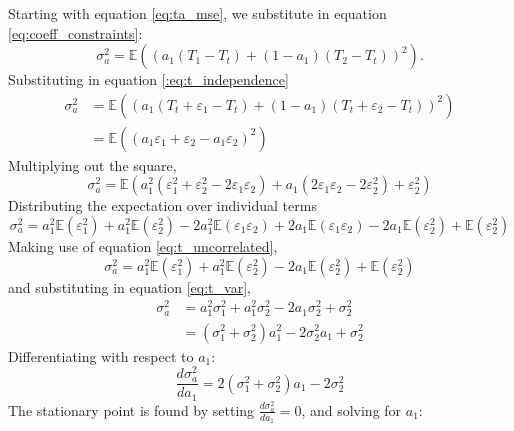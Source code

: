 Starting with equation \ref{eq:ta_mse}, we substitute in equation \ref{eq:coeff_constraints}:
\begin{equation*}
        \sigma_a^2 = \mathbb{E} \left( \left( a_1 \left( T_1 - T_t \right) + (1 - a_1) \left( T_2 - T_t \right) \right)^2 \right).
\end{equation*}
Substituting in equation \ref{:eq:t_independence}
\begin{align*}
        \sigma_a^2 &= \mathbb{E} \left( \left( a_1 \left( T_t + \varepsilon_1 - T_t \right) + (1 - a_1) \left( T_t +\varepsilon_2 - T_t \right) \right)^2 \right) \\
                    &= \mathbb{E} \left( \left( a_1 \varepsilon_1 +\varepsilon_2 - a_1 \varepsilon_2 \right)^2 \right)
\end{align*}
Multiplying out the square,
\begin{equation*}
    \sigma_a^2 = \mathbb{E} \left( a_1^2 \left( \varepsilon_1^2 + \varepsilon_2^2 - 2 \varepsilon_1 \varepsilon_2 \right) + a_1 \left( 2 \varepsilon_1 \varepsilon_2 - 2 \varepsilon_2^2 \right) + \varepsilon_2^2 \right)
\end{equation*}
Distributing the expectation over individual terms
\begin{equation*}
    \sigma_a^2 = a_1^2 \mathbb{E}(\varepsilon_1^2) + a_1^2 \mathbb{E}(\varepsilon_2^2) - 2 a_1^2 \mathbb{E}(\varepsilon_1 \varepsilon_2) + 2 a_1 \mathbb{E}(\varepsilon_1 \varepsilon_2) - 2 a_1 \mathbb{E}(\varepsilon_2^2) + \mathbb{E}(\varepsilon_2^2)
\end{equation*}
Making use of equation \ref{eq:t_uncorrelated},
\begin{equation*}
   \sigma_a^2 = a_1^2 \mathbb{E}(\varepsilon_1^2) + a_1^2 \mathbb{E}(\varepsilon_2^2) - 2 a_1 \mathbb{E}(\varepsilon_2^2) + \mathbb{E}(\varepsilon_2^2)
\end{equation*}
and substituting in equation \ref{eq:t_var},
\begin{align*}
   \sigma_a^2 &= a_1^2 \sigma_1^2 + a_1^2 \sigma_2^2 - 2 a_1 \sigma_2^2 + \sigma_2^2 \\
                &= \left( \sigma_1^2 + \sigma_2^2 \right) a_1^2 - 2 \sigma_2^2 a_1 + \sigma_2^2
\end{align*}
Differentiating with respect to $a_1$:
\begin{equation}
    \frac{d \sigma_a^2}{da_1} = 2 \left( \sigma_1^2 + \sigma_2^2 \right) a_1 - 2 \sigma_2^2 \label{eq:derivative1}
\end{equation}
The stationary point is found by setting $\frac{d \sigma_a^2}{da_1} = 0$, and solving for $a_1$:
